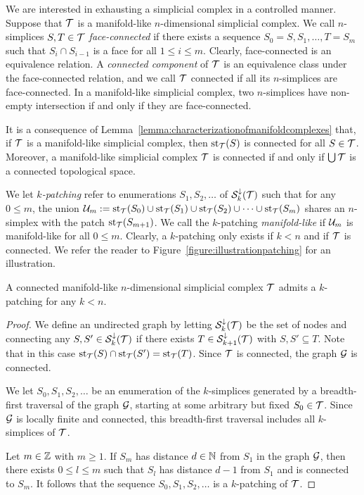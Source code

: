 \documentclass[a4paper]{article}
\begin{document}
We are interested in exhausting a simplicial complex in a controlled manner. 
Suppose that ${\mathcal T}$ is a manifold-like $n$-dimensional simplicial complex. 
We call $n$-simplices $S,T \in {\mathcal T}$ \emph{face-connected} if there exists a sequence $S_0=S,S_1,\dots,T=S_m$ such that $S_{i} \cap S_{i-1}$ is a face for all $1 \leq i \leq m$. Clearly, face-connected is an equivalence relation. A \emph{connected component} of ${\mathcal T}$ is an equivalence class under the face-connected relation, and we call ${\mathcal T}$ connected if all its $n$-simplices are face-connected. 
In a manifold-like simplicial complex, two $n$-simplices have non-empty intersection if and only if they are face-connected. 

It is a consequence of Lemma~\ref{lemma:characterizationofmanifoldcomplexes} that,
if ${\mathcal T}$ is a manifold-like simplicial complex, then $\operatorname{st}_{{\mathcal T}}(S)$ is connected for all $S \in {\mathcal T}$.
Moreover, a manifold-like simplicial complex ${\mathcal T}$ is connected if and only if $\bigcup{\mathcal T}$ is a connected topological space. 

We let \emph{$k$-patching} refer to enumerations $S_1, S_2, \dots$ of ${\mathcal S}^{\downarrow}_{k}({\mathcal T})$
such that for any $0 \leq m$, the union 
${\mathcal U}_{m} := \operatorname{st}_{{\mathcal T}}(S_0) \cup \operatorname{st}_{{\mathcal T}}(S_1) \cup \operatorname{st}_{{\mathcal T}}(S_2) \cup \dots \cup \operatorname{st}_{{\mathcal T}}(S_m)$
shares an $n$-simplex with the patch $\operatorname{st}_{{\mathcal T}}(S_{m+1})$.
We call the $k$-patching \emph{manifold-like} if ${\mathcal U}_{m}$ is manifold-like for all $0 \leq m$.
Clearly, a $k$-patching only exists if $k < n$ and if ${\mathcal T}$ is connected. 
We refer the reader to Figure~\ref{figure:illustrationpatching} for an illustration.

\begin{lemma}
    A connected manifold-like $n$-dimensional simplicial complex ${\mathcal T}$ admits a $k$-patching for any $k < n$.
\end{lemma}
\begin{proof}
    We define an undirected graph by letting ${\mathcal S}^{\downarrow}_{k}({\mathcal T})$ be the set of nodes 
    and connecting any $S, S' \in {\mathcal S}^{\downarrow}_{k}({\mathcal T})$ if there exists $T \in {\mathcal S}^{\downarrow}_{k+1}({\mathcal T})$ with $S, S' \subseteq T$. 
    Note that in this case $\operatorname{st}_{{\mathcal T}}(S) \cap \operatorname{st}_{{\mathcal T}}(S') = \operatorname{st}_{{\mathcal T}}(T)$. 
    Since ${\mathcal T}$ is connected, the graph ${\mathcal G}$ is connected. 
    
    We let $S_0, S_1, S_2, \dots$ be an enumeration of the $k$-simplices generated by a breadth-first traversal of the graph ${\mathcal G}$,
    starting at some arbitrary but fixed $S_0 \in {\mathcal T}$. 
    Since ${\mathcal G}$ is locally finite and connected, 
    this breadth-first traversal includes all $k$-simplices of ${\mathcal T}$.
    
    Let $m \in {\mathbb Z}$ with $m \geq 1$. If $S_m$ has distance $d \in {\mathbb N}$ from $S_1$ in the graph ${\mathcal G}$,
    then there exists $0 \leq l \leq m$ such that $S_l$ has distance $d-1$ from $S_1$ and is connected to $S_m$. 
    It follows that the sequence $S_0, S_1, S_2, \dots$ is a $k$-patching of ${\mathcal T}$. 
\end{proof}
\end{document}
